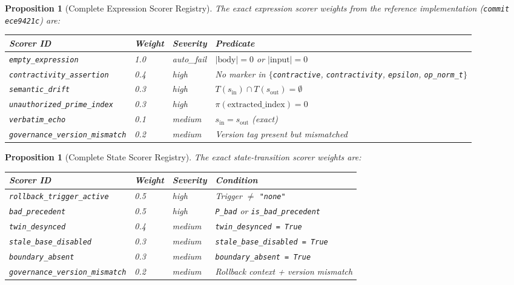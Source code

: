 \documentclass[11pt,letterpaper]{article}
\newtheorem{proposition}[theorem]{Proposition}
\theoremstyle{remark}
\begin{document}
\begin{proposition}[Complete Expression Scorer Registry]
\label{prop:expr-registry}
The exact expression scorer weights from the reference implementation
(\texttt{commit ece9421c}) are:

\begin{center}
\begin{tabular}{llll}
\toprule
\textbf{Scorer ID} & \textbf{Weight} & \textbf{Severity} & \textbf{Predicate} \\
\midrule
\texttt{empty\_expression}          & 1.0 & auto\_fail & $|\text{body}| = 0$ or $|\text{input}| = 0$ \\
\texttt{contractivity\_assertion}    & 0.4 & high       & No marker in
$\{$\texttt{contractive}, \texttt{contractivity}, \texttt{epsilon}, \texttt{op\_norm\_t}$\}$ \\
\texttt{semantic\_drift}            & 0.3 & high       & $T(s_{\text{in}}) \cap T(s_{\text{out}}) = \emptyset$ \\
\texttt{unauthorized\_prime\_index} & 0.3 & high       & $\pi(\text{extracted\_index}) = 0$ \\
\texttt{verbatim\_echo}             & 0.1 & medium     & $s_{\text{in}} = s_{\text{out}}$ (exact) \\
\texttt{governance\_version\_mismatch} & 0.2 & medium  & Version tag present but mismatched \\
\bottomrule
\end{tabular}
\end{center}
\end{proposition}

\begin{proposition}[Complete State Scorer Registry]
\label{prop:state-registry}
The exact state-transition scorer weights are:

\begin{center}
\begin{tabular}{llll}
\toprule
\textbf{Scorer ID} & \textbf{Weight} & \textbf{Severity} & \textbf{Condition} \\
\midrule
\texttt{rollback\_trigger\_active}  & 0.5 & high   & Trigger $\neq$ \texttt{"none"} \\
\texttt{bad\_precedent}             & 0.5 & high   & \texttt{P\_bad} or \texttt{is\_bad\_precedent} \\
\texttt{twin\_desynced}             & 0.4 & medium & \texttt{twin\_desynced = True} \\
\texttt{stale\_base\_disabled}      & 0.3 & medium & \texttt{stale\_base\_disabled = True} \\
\texttt{boundary\_absent}           & 0.3 & medium & \texttt{boundary\_absent = True} \\
\texttt{governance\_version\_mismatch} & 0.2 & medium & Rollback context + version mismatch \\
\bottomrule
\end{tabular}
\end{center}
\end{proposition}
\end{document}
